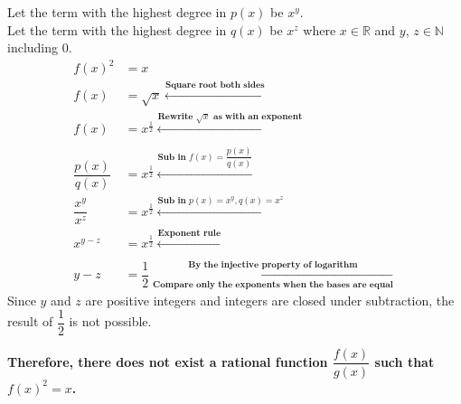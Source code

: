 \documentclass[12pt]{book}
\begin{document}
\begin{enumerate}
Let the term with the highest degree in $p(x)$ be $x^y$.\\
Let the term with the highest degree in $q(x)$ be $x^z$ where $x \in \mathbb{R}$ and $y$, $z \in \mathbb{N}$ including 0.
\setcounter{equation}{0}
\begin{align*}
    f(x)^2 &= x \\
    f(x) &= \sqrt{x} \xleftarrow[]{\textbf{Square root both sides}}\\ 
    f(x) &= x^{\frac{1}{2}} \xleftarrow[]{\textbf{Rewrite $\sqrt{x}$ as with an exponent}}\\
    \dfrac{p(x)}{q(x)} &= x^{\frac{1}{2}} \xleftarrow[]{\textbf{Sub in $f(x) = \dfrac{p(x)}{q(x)}$}}\\
    \dfrac{x^y}{x^z} &= x^{\frac{1}{2}} \xleftarrow[]{\textbf{Sub in $p(x) = x^y, q(x) = x^z$}}\\
    x^{y-z} &= x^{\frac{1}{2}} \xleftarrow[]{\textbf{Exponent rule}}\\
    y - z &= \dfrac{1}{2} \xleftarrow[\textbf{Compare only the exponents when the bases are equal}]{\textbf{By the injective property of logarithm}}
\end{align*}
Since $y$ and $z$ are positive integers and integers are closed under subtraction, the result of $\dfrac{1}{2}$ is not possible.

\textbf{Therefore, there does not exist a rational function $\dfrac{f(x)}{g(x)}$ such that $f(x)^2 = x$.}

\newpage

\end{enumerate}
\end{document}
